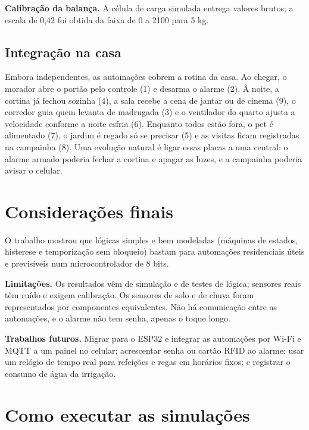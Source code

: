 \documentclass[12pt]{article}
\begin{document}
\textbf{Calibração da balança.} A célula de carga simulada entrega valores brutos; a escala de 0,42 foi obtida da faixa de 0 a 2100 para 5 kg.

\subsection{Integração na casa}

Embora independentes, as automações cobrem a rotina da casa. Ao chegar, o morador abre o portão pelo controle (1) e desarma o alarme (2). À noite, a cortina já fechou sozinha (4), a sala recebe a cena de jantar ou de cinema (9), o corredor guia quem levanta de madrugada (3) e o ventilador do quarto ajusta a velocidade conforme a noite esfria (6). Enquanto todos estão fora, o pet é alimentado (7), o jardim é regado só se precisar (5) e as visitas ficam registradas na campainha (8). Uma evolução natural é ligar essas placas a uma central: o alarme armado poderia fechar a cortina e apagar as luzes, e a campainha poderia avisar o celular.

\section{Considerações finais}\label{sec:final}

O trabalho mostrou que lógicas simples e bem modeladas (máquinas de estados, histerese e temporização sem bloqueio) bastam para automações residenciais úteis e previsíveis num microcontrolador de 8 bits.

\textbf{Limitações.} Os resultados vêm de simulação e de testes de lógica; sensores reais têm ruído e exigem calibração. Os sensores de solo e de chuva foram representados por componentes equivalentes. Não há comunicação entre as automações, e o alarme não tem senha, apenas o toque longo.

\textbf{Trabalhos futuros.} Migrar para o ESP32 e integrar as automações por Wi-Fi e MQTT a um painel no celular; acrescentar senha ou cartão RFID ao alarme; usar um relógio de tempo real para refeições e regas em horários fixos; e registrar o consumo de água da irrigação.




\appendix

\section{Como executar as simulações}\label{ap:exec}
\end{document}
